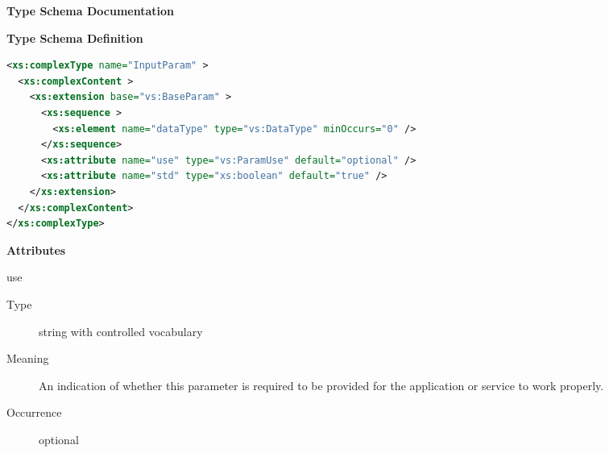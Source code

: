 \documentclass[11pt,a4paper]{ivoa}
\begin{document}
\begin{generated}
\begingroup
        \renewcommand*\descriptionlabel[1]{%
        \hbox to 5.5em{\emph{#1}\hfil}}\vspace{2ex}\noindent\textbf{ Type Schema Documentation}



\vspace{1ex}\noindent\textbf{ Type Schema Definition}

\begin{lstlisting}[language=XML,basicstyle=\footnotesize]
<xs:complexType name="InputParam" >
  <xs:complexContent >
    <xs:extension base="vs:BaseParam" >
      <xs:sequence >
        <xs:element name="dataType" type="vs:DataType" minOccurs="0" />
      </xs:sequence>
      <xs:attribute name="use" type="vs:ParamUse" default="optional" />
      <xs:attribute name="std" type="xs:boolean" default="true" />
    </xs:extension>
  </xs:complexContent>
</xs:complexType>
\end{lstlisting}

\vspace{0.5ex}\noindent\textbf{ Attributes}

\begingroup\small\begin{bigdescription}
\item[use]
\begin{description}
\item[Type] string with controlled vocabulary
\item[Meaning] An indication of whether this parameter is
                     required to be provided for the application
                     or service to work properly.
\item[Occurrence] optional


\end{description}
\end{bigdescription}
\end{generated}
\end{document}
